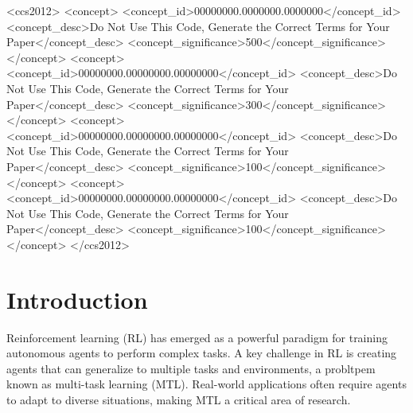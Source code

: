 \documentclass[sigconf]{acmart}
\begin{document}
\begin{CCSXML}
<ccs2012>
 <concept>
  <concept_id>00000000.0000000.0000000</concept_id>
  <concept_desc>Do Not Use This Code, Generate the Correct Terms for Your Paper</concept_desc>
  <concept_significance>500</concept_significance>
 </concept>
 <concept>
  <concept_id>00000000.00000000.00000000</concept_id>
  <concept_desc>Do Not Use This Code, Generate the Correct Terms for Your Paper</concept_desc>
  <concept_significance>300</concept_significance>
 </concept>
 <concept>
  <concept_id>00000000.00000000.00000000</concept_id>
  <concept_desc>Do Not Use This Code, Generate the Correct Terms for Your Paper</concept_desc>
  <concept_significance>100</concept_significance>
 </concept>
 <concept>
  <concept_id>00000000.00000000.00000000</concept_id>
  <concept_desc>Do Not Use This Code, Generate the Correct Terms for Your Paper</concept_desc>
  <concept_significance>100</concept_significance>
 </concept>
</ccs2012>
\end{CCSXML}





\maketitle

\section{Introduction}
Reinforcement learning (RL) has emerged as a powerful paradigm for 
training autonomous agents to perform complex tasks. A key challenge 
in RL is creating agents that can generalize to multiple tasks and 
environments, a probltpem known as multi-task learning (MTL). Real-world 
applications often require agents to adapt to diverse situations, 
making MTL a critical area of research.
\end{document}

